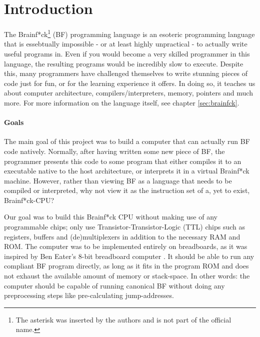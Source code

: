 \section{Introduction} \label{sec:introduction}
The Brainf*ck\footnote{The asterisk was inserted by the authors and is not part of the official name.} (BF) programming language is an esoteric programming language that is essebtually impossible - or at least highly unpractical - to actually write useful programs in. Even if you would become a very skilled programmer in this language, the resulting programs would be incredibly slow to execute. Despite this, many programmers have challenged themselves to write stunning pieces of code just for fun, or for the learning experience it offers. In doing so, it teaches us about computer architecture, compilers/interpreters, memory, pointers and much more. For more information on the language itself, see chapter \ref{sec:brainfck}.

\paragraph{Goals} The main goal of this project was to build a computer that can actually run BF code natively. Normally, after having written some new piece of BF, the programmer presents this code to some program that either compiles it to an executable native to the host architecture, or interprets it in a virtual Brainf*ck machine. However, rather than viewing BF as a language that needs to be compiled or interpreted, why not view it as the instruction set of a, yet to exist, Brainf*ck-CPU?

Our goal was to build this Brainf*ck CPU without making use of any programmable chips; only use Transistor-Transistor-Logic (TTL) chips such as registers, buffers and (de)multiplexers in addition to the necessary RAM and ROM. The computer was to be implemented entirely on breadboards, as it was inspired by Ben Eater's 8-bit breadboard computer \cite{beneater}. It should be able to run any compliant BF program directly, as long as it fits in the program ROM and does not exhaust the available amount of memory or stack-space. In other words: the computer should be capable of running canonical BF without doing any preprocessing steps like pre-calculating jump-addresses.

